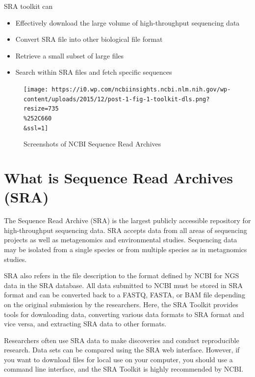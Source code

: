 \documentclass[
  letterpaper,
  DIV=11,
  numbers=noendperiod]{scrreprt}
\providecommand{\tightlist}{%
  \setlength{\itemsep}{0pt}\setlength{\parskip}{0pt}}\usepackage{longtable,booktabs,array}
\begin{document}
SRA toolkit can

\begin{itemize}
\tightlist
\item
  Effectively download the large volume of high-throughput sequencing
  data
\item
  Convert SRA file into other biological file format
\item
  Retrieve a small subset of large files
\item
  Search within SRA files and fetch specific sequences
\end{itemize}

\begin{figure}

{\centering \texttt{[image: https://i0.wp.com/ncbiinsights.ncbi.nlm.nih.gov/wp-content/uploads/2015/12/post-1-fig-1-toolkit-dls.png?resize=735\\\%252C660\\\&ssl=1]}

}

\caption{Screenshots of NCBI Sequence Read Archives}

\end{figure}

\hypertarget{what-is-sequence-read-archives-sra}{%
\section{What is Sequence Read Archives
(SRA)}\label{what-is-sequence-read-archives-sra}}

The Sequence Read Archive (SRA) is the largest publicly accessible
repository for high-throughput sequencing data. SRA accepts data from
all areas of sequencing projects as well as metagenomics and
environmental studies. Sequencing data may be isolated from a single
species or from multiple species as in metagnomics studies.

SRA also refers in the file description to the format defined by NCBI
for NGS data in the SRA database. All data submitted to NCBI must be
stored in SRA format and can be converted back to a FASTQ, FASTA, or BAM
file depending on the original submission by the researchers. Here, the
SRA Toolkit provides tools for downloading data, converting various data
formats to SRA format and vice versa, and extracting SRA data to other
formats.

Researchers often use SRA data to make discoveries and conduct
reproducible research. Data sets can be compared using the SRA web
interface. However, if you want to download files for local use on your
computer, you should use a command line interface, and the SRA Toolkit
is highly recommended by NCBI.
\end{document}
